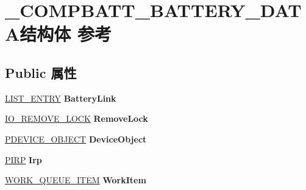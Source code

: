 \hypertarget{struct___c_o_m_p_b_a_t_t___b_a_t_t_e_r_y___d_a_t_a}{}\section{\+\_\+\+C\+O\+M\+P\+B\+A\+T\+T\+\_\+\+B\+A\+T\+T\+E\+R\+Y\+\_\+\+D\+A\+T\+A结构体 参考}
\label{struct___c_o_m_p_b_a_t_t___b_a_t_t_e_r_y___d_a_t_a}
\subsection*{Public 属性}
\begin{DoxyCompactItemize}
\item 
\mbox{\label{struct___c_o_m_p_b_a_t_t___b_a_t_t_e_r_y___d_a_t_a_a3c67d2ac8a05c67d0a21f35214af52b1}} 
\hyperlink{struct___l_i_s_t___e_n_t_r_y}{L\+I\+S\+T\+\_\+\+E\+N\+T\+RY} {\bfseries Battery\+Link}
\item 
\mbox{\label{struct___c_o_m_p_b_a_t_t___b_a_t_t_e_r_y___d_a_t_a_ac5e7e6ceda723266d4af6795f7cc2f35}} 
\hyperlink{struct___i_o___r_e_m_o_v_e___l_o_c_k}{I\+O\+\_\+\+R\+E\+M\+O\+V\+E\+\_\+\+L\+O\+CK} {\bfseries Remove\+Lock}
\item 
\mbox{\label{struct___c_o_m_p_b_a_t_t___b_a_t_t_e_r_y___d_a_t_a_a309dc67fbfa6b4c28906080314d1d8c6}} 
\hyperlink{struct___d_e_v_i_c_e___o_b_j_e_c_t}{P\+D\+E\+V\+I\+C\+E\+\_\+\+O\+B\+J\+E\+CT} {\bfseries Device\+Object}
\item 
\mbox{\label{struct___c_o_m_p_b_a_t_t___b_a_t_t_e_r_y___d_a_t_a_a94cb5545951b144cec721a2baf4991ae}} 
\hyperlink{interfacevoid}{P\+I\+RP} {\bfseries Irp}
\item 
\mbox{\label{struct___c_o_m_p_b_a_t_t___b_a_t_t_e_r_y___d_a_t_a_aa3e61b68a5dc9f079d51ab2140befabd}} 
\hyperlink{struct___w_o_r_k___q_u_e_u_e___i_t_e_m}{W\+O\+R\+K\+\_\+\+Q\+U\+E\+U\+E\+\_\+\+I\+T\+EM} {\bfseries Work\+Item}
\item 
\mbox{\label{struct___c_o_m_p_b_a_t_t___b_a_t_t_e_r_y___d_a_t_a_aff541c8152e9e571dc0bf9587791acd7}} 

\end{DoxyCompactItemize}
